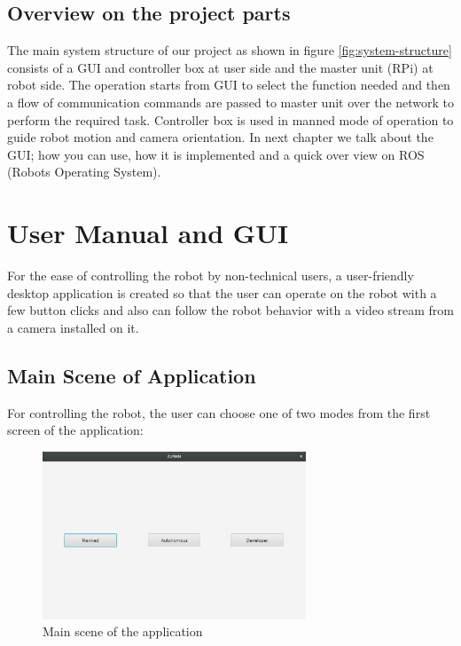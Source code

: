 \documentclass[12pt]{book}
\begin{document}
\section{Overview on the project parts}
The main system structure of our project as shown in figure \ref{fig:system-structure} consists of a GUI and controller box at user side and the master unit (RPi) at robot side. The operation starts from GUI to select the function needed and then a flow of communication commands are passed to master unit over the network to perform the required task. Controller box is used in manned mode of operation to guide robot motion and camera orientation. In next chapter we talk about the GUI; how you can use, how it is implemented and a quick over view on ROS (Robots Operating System).







\chapter{User Manual and GUI}
For the ease of controlling the robot by non-technical users, a user-friendly desktop application is created so that the user can operate on the robot with a few button clicks and also can follow the robot behavior with a video stream from a camera installed on it.

\section{Main Scene of Application}
For controlling the robot, the user can choose one of two modes from the first screen of the application:
\begin{figure}
	\centering
	\includegraphics[width =0.7\textwidth]{Fig/gui-main.png}
	\caption{ Main scene of the application}
	\label{fig:gui-main}
\end{figure}
\end{document}
